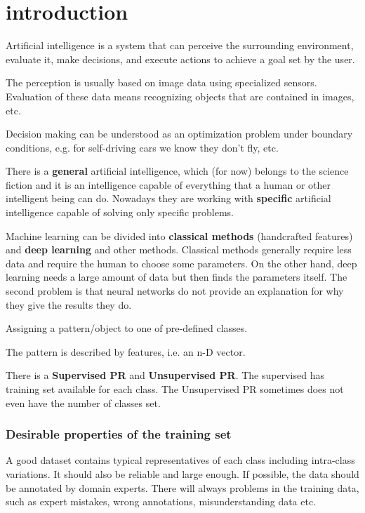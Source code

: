 \chapter{introduction}

Artificial intelligence is a system that can perceive the surrounding environment, evaluate it, make decisions, and execute actions to achieve a goal set by the user.

The perception is usually based on image data using specialized sensors. Evaluation of these data means recognizing objects that are contained in images, etc.

Decision making can be understood as an optimization problem under boundary conditions, e.g. for self-driving cars we know they don't fly, etc.

There is a \textbf{general} artificial intelligence, which (for now) belongs to the science fiction and it is an intelligence capable of everything that a human or other intelligent being can do. Nowadays they are working with \textbf{specific} artificial intelligence capable of solving only specific problems.

Machine learning can be divided into \textbf{classical methods} (handcrafted features) and \textbf{deep learning} and other methods. Classical methods generally require less data and require the human to choose some parameters. On the other hand, deep learning needs a large amount of data but then finds the parameters itself. The second problem is that neural networks do not provide an explanation for why they give the results they do.

\begin{define}
  Assigning a pattern/object to one of pre-defined classes.
\end{define}

\begin{define}
  The pattern is described by features, i.e. an n-D vector.
\end{define}

There is a \textbf{Supervised PR} and \textbf{Unsupervised PR}. The supervised has training set available for each class. The Unsupervised PR sometimes does not even have the number of classes set.

\subsection*{Desirable properties of the training set}
A good dataset contains typical representatives of each class including intra-class variations. It should also be reliable and large enough. If possible, the data should be annotated by domain experts. There will always problems in the training data, such as expert mistakes, wrong annotations, misunderstanding data etc.

